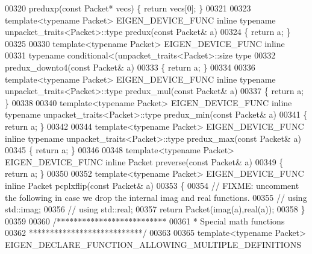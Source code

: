 \begin{DoxyCode}
{{00320 preduxp(\textcolor{keyword}{const} Packet* vecs) \{ \textcolor{keywordflow}{return} vecs[0]; \}
00321 
00323 \textcolor{keyword}{template}<\textcolor{keyword}{typename} Packet> EIGEN\_DEVICE\_FUNC \textcolor{keyword}{inline} \textcolor{keyword}{typename} unpacket\_traits<Packet>::type predux(\textcolor{keyword}{const} 
      Packet& a)
00324 \{ \textcolor{keywordflow}{return} a; \}
00325 
00330 \textcolor{keyword}{template}<\textcolor{keyword}{typename} Packet> EIGEN\_DEVICE\_FUNC \textcolor{keyword}{inline}
00331 \textcolor{keyword}{typename} conditional<(unpacket\_traits<Packet>::size%
      type
00332 predux\_downto4(\textcolor{keyword}{const} Packet& a)
00333 \{ \textcolor{keywordflow}{return} a; \}
00334 
00336 \textcolor{keyword}{template}<\textcolor{keyword}{typename} Packet> EIGEN\_DEVICE\_FUNC \textcolor{keyword}{inline} \textcolor{keyword}{typename} unpacket\_traits<Packet>::type predux\_mul(\textcolor{keyword}{const} 
      Packet& a)
00337 \{ \textcolor{keywordflow}{return} a; \}
00338 
00340 \textcolor{keyword}{template}<\textcolor{keyword}{typename} Packet> EIGEN\_DEVICE\_FUNC \textcolor{keyword}{inline} \textcolor{keyword}{typename} unpacket\_traits<Packet>::type predux\_min(\textcolor{keyword}{const} 
      Packet& a)
00341 \{ \textcolor{keywordflow}{return} a; \}
00342 
00344 \textcolor{keyword}{template}<\textcolor{keyword}{typename} Packet> EIGEN\_DEVICE\_FUNC \textcolor{keyword}{inline} \textcolor{keyword}{typename} unpacket\_traits<Packet>::type predux\_max(\textcolor{keyword}{const} 
      Packet& a)
00345 \{ \textcolor{keywordflow}{return} a; \}
00346 
00348 \textcolor{keyword}{template}<\textcolor{keyword}{typename} Packet> EIGEN\_DEVICE\_FUNC \textcolor{keyword}{inline} Packet preverse(\textcolor{keyword}{const} Packet& a)
00349 \{ \textcolor{keywordflow}{return} a; \}
00350 
00352 \textcolor{keyword}{template}<\textcolor{keyword}{typename} Packet> EIGEN\_DEVICE\_FUNC \textcolor{keyword}{inline} Packet pcplxflip(\textcolor{keyword}{const} Packet& a)
00353 \{
00354   \textcolor{comment}{// FIXME: uncomment the following in case we drop the internal imag and real functions.}
00355 \textcolor{comment}{//   using std::imag;}
00356 \textcolor{comment}{//   using std::real;}
00357   \textcolor{keywordflow}{return} Packet(imag(a),real(a));
00358 \}
00359 
00360 \textcolor{comment}{/**************************}
00361 \textcolor{comment}{* Special math functions}
00362 \textcolor{comment}{***************************/}
00363 
00365 \textcolor{keyword}{template}<\textcolor{keyword}{typename} Packet> EIGEN\_DECLARE\_FUNCTION\_ALLOWING\_MULTIPLE\_DEFINITIONS
}}
\end{DoxyCode}
